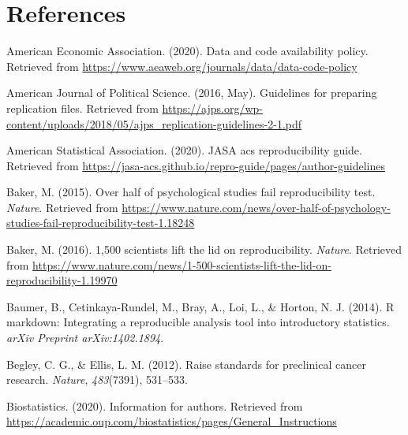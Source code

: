 \documentclass[12pt,twoside]{reedthesis}
\begin{document}
\backmatter

\hypertarget{references}{%
\chapter*{References}\label{references}}


\noindent

\setlength{\parindent}{-0.20in}
\setlength{\leftskip}{0.20in}
\setlength{\parskip}{8pt}

\hypertarget{refs}{}
\leavevmode\hypertarget{ref-aee-policy}{}%
American Economic Association. (2020). Data and code availability policy. Retrieved from \url{https://www.aeaweb.org/journals/data/data-code-policy}

\leavevmode\hypertarget{ref-ajps-guidelines}{}%
American Journal of Political Science. (2016, May). Guidelines for preparing replication files. Retrieved from \url{https://ajps.org/wp-content/uploads/2018/05/ajps_replication-guidelines-2-1.pdf}

\leavevmode\hypertarget{ref-asa-guide}{}%
American Statistical Association. (2020). JASA acs reproducibility guide. Retrieved from \url{https://jasa-acs.github.io/repro-guide/pages/author-guidelines}

\leavevmode\hypertarget{ref-nature-psych}{}%
Baker, M. (2015). Over half of psychological studies fail reproducibility test. \emph{Nature}. Retrieved from \url{https://www.nature.com/news/over-half-of-psychology-studies-fail-reproducibility-test-1.18248}

\leavevmode\hypertarget{ref-nature-crisis}{}%
Baker, M. (2016). 1,500 scientists lift the lid on reproducibility. \emph{Nature}. Retrieved from \url{https://www.nature.com/news/1-500-scientists-lift-the-lid-on-reproducibility-1.19970}

\leavevmode\hypertarget{ref-baumer2014r}{}%
Baumer, B., Cetinkaya-Rundel, M., Bray, A., Loi, L., \& Horton, N. J. (2014). R markdown: Integrating a reproducible analysis tool into introductory statistics. \emph{arXiv Preprint arXiv:1402.1894}.

\leavevmode\hypertarget{ref-begley2012raise}{}%
Begley, C. G., \& Ellis, L. M. (2012). Raise standards for preclinical cancer research. \emph{Nature}, \emph{483}(7391), 531--533.

\leavevmode\hypertarget{ref-journal-biostats}{}%
Biostatistics. (2020). Information for authors. Retrieved from \url{https://academic.oup.com/biostatistics/pages/General_Instructions}
\end{document}
